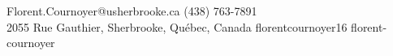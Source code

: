 \documentclass[11pt]{article}
\begin{document}
{Florent.Cournoyer@usherbrooke.ca}
{(438) 763-7891 \\}
{2055 Rue Gauthier, Sherbrooke, Québec, Canada}
{florentcournoyer16}
{florent-cournoyer}
















\end{document}
